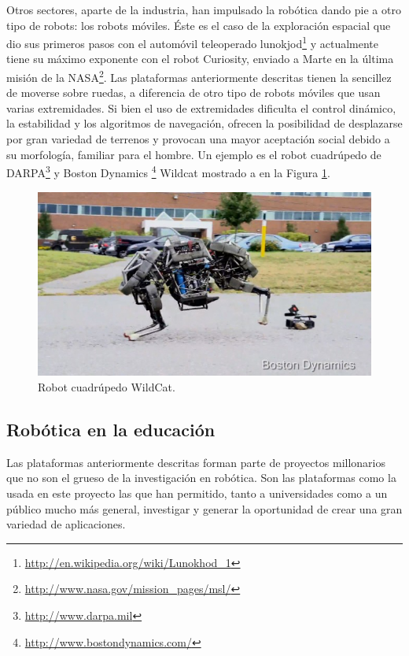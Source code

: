 \documentclass[12pt,a4paper,final,twoside]{book}
\begin{document}
Otros sectores, aparte de la industria, han impulsado la robótica dando pie a otro tipo de robots: los robots móviles. Éste es el caso de la exploración espacial que dio sus primeros pasos con el automóvil teleoperado lunokjod\footnote{\url{http://en.wikipedia.org/wiki/Lunokhod_1}} y actualmente tiene su máximo exponente con el robot Curiosity, enviado a Marte en la última misión de la NASA\footnote{\url{http://www.nasa.gov/mission_pages/msl/}}. Las plataformas anteriormente descritas tienen la sencillez de moverse sobre ruedas, a diferencia de otro tipo de robots móviles que usan varias extremidades. Si bien el uso de extremidades dificulta el control dinámico, la estabilidad y los algoritmos de  navegación, ofrecen la posibilidad de desplazarse por gran variedad de terrenos y provocan una mayor aceptación social debido a su morfología, familiar para el hombre. Un ejemplo es el robot cuadrúpedo de DARPA\footnote{\url{http://www.darpa.mil}} y Boston Dynamics \footnote{\url{http://www.bostondynamics.com/}} Wildcat mostrado a en la Figura \ref{fig:wildcat}.

\begin{figure}[H]
	\centering
    \includegraphics[scale=0.6]	{images/Wildcat.jpg}
	 \caption{Robot cuadrúpedo WildCat.}
  \label{fig:wildcat}
\end{figure}

\subsection{Robótica en la educación}

Las plataformas anteriormente descritas forman parte de proyectos millonarios que no son el grueso de la investigación en robótica.
Son las plataformas como la usada en este proyecto las que han permitido, tanto a universidades como a un público mucho más general, investigar y generar la oportunidad de crear una gran variedad de aplicaciones.
\end{document}
